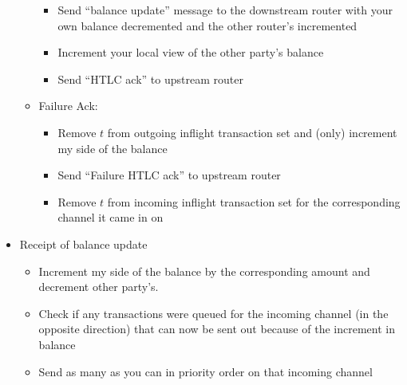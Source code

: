 \documentclass[a4paper]{article}
\begin{document}
\begin{itemize}
\begin{itemize}
\begin{itemize}
                    \item Send ``balance update'' message to the downstream router with your own balance decremented and the other router's incremented
                    \item Increment your local view of the other party's balance
                    \item Send ``HTLC ack'' to upstream router
                \end{itemize}
            \item Failure Ack:
                \begin{itemize}
                    \item Remove $t$ from outgoing inflight transaction set and (only) increment my side of the balance
                    \item Send ``Failure HTLC ack'' to upstream router
                    \item Remove $t$ from incoming inflight transaction set for the corresponding channel it came in on
                \end{itemize}

        \end{itemize}
    \item Receipt of balance update
        \begin{itemize}
            \item Increment my side of the balance by the corresponding amount and decrement other party's.
            \item Check if any transactions were queued for the incoming channel (in the opposite direction) that can now be sent out because of the increment in balance
            \item Send as many as you can in priority order on that incoming channel

        \end{itemize}
\end{itemize}
\end{document}
